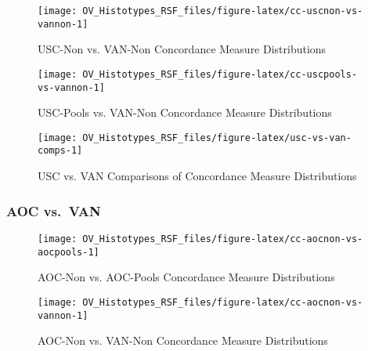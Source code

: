 \documentclass[
]{report}
\begin{document}
\begin{figure}[H]

{\centering \texttt{[image: OV\_Histotypes\_RSF\_files/figure-latex/cc-uscnon-vs-vannon-1]} 

}

\caption{USC-Non vs. VAN-Non Concordance Measure Distributions}\label{fig:cc-uscnon-vs-vannon}
\end{figure}

\begin{figure}[H]

{\centering \texttt{[image: OV\_Histotypes\_RSF\_files/figure-latex/cc-uscpools-vs-vannon-1]} 

}

\caption{USC-Pools vs. VAN-Non Concordance Measure Distributions}\label{fig:cc-uscpools-vs-vannon}
\end{figure}

\begin{figure}[H]

{\centering \texttt{[image: OV\_Histotypes\_RSF\_files/figure-latex/usc-vs-van-comps-1]} 

}

\caption{USC vs. VAN Comparisons of Concordance Measure Distributions}\label{fig:usc-vs-van-comps}
\end{figure}

\hypertarget{aoc-vs.-van}{%
\subsubsection{AOC vs.~VAN}\label{aoc-vs.-van}}

\begin{figure}[H]

{\centering \texttt{[image: OV\_Histotypes\_RSF\_files/figure-latex/cc-aocnon-vs-aocpools-1]} 

}

\caption{AOC-Non vs. AOC-Pools Concordance Measure Distributions}\label{fig:cc-aocnon-vs-aocpools}
\end{figure}

\begin{figure}[H]

{\centering \texttt{[image: OV\_Histotypes\_RSF\_files/figure-latex/cc-aocnon-vs-vannon-1]} 

}

\caption{AOC-Non vs. VAN-Non Concordance Measure Distributions}\label{fig:cc-aocnon-vs-vannon}
\end{figure}
\end{document}
